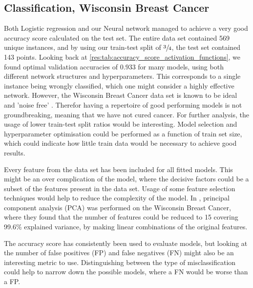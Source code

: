     \subsection{Classification, Wisconsin Breast Cancer}
        Both Logistic regression and our Neural network managed to achieve a very good accuracy score calculated on the test set. The entire data set contained 569 unique instances, and by using our train-test split of $\sfrac{3}{4}$, the test set contained 143 points. Looking back at \cref{res:tab:accuracy_score_activation_functions}, we found optimal validation accuracies of $0.933$ for many models, using both different network structures and hyperparameters. This corresponds to a single instance being wrongly classified, which one might consider a highly effective network. However, the Wisconsin Breast Cancer data set is known to be ideal and 'noise free' \citep{easyCancer}. Therefor having a repertoire of good performing models is not groundbreaking, meaning that we have not cured cancer. For further analysis, the usage of lower train-test split ratios would be interesting. Model selection and hyperparameter optimisation could be performed as a function of train set size, which could indicate how little train data would be necessary to achieve good results. 
        
        Every feature from the data set has been included for all fitted models. This might be an over complication of the model, where the decisive factors could be a subset of the features present in the data set. Usage of some feature selection techniques would help to reduce the complexity of the model. In \citep{inproceedings}, principal component analysis (PCA) was performed on the Wisconsin Breast Cancer, where they found that the number of features could be reduced to 15 covering 99.6\% explained variance, by making linear combinations of the original features.

        The accuracy score has consistently been used to evaluate models, but looking at the number of false positives (FP) and false negatives (FN) might also be an interesting metric to use. Distinguishing between the type of misclassification could help to narrow down the possible models, where a FN would be worse than a FP.
    

